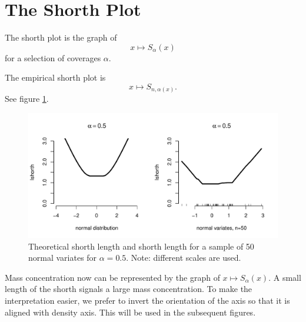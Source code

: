 \documentclass[dvips,12pt,a4paper,twoside]{amsart}
\begin{document}
\section{The Shorth Plot}
\begin{dfn}
The shorth plot is the graph of 
$$x \mapsto S_\alpha(x)$$
 for a selection of coverages $\alpha$.
\end{dfn}

The empirical shorth plot is $$x \mapsto S_{n,\alpha(x)}.$$ See figure \ref{fig:shorthdef}.
\begin{figure}[htb]
\includegraphics[width=1.0\linewidth]{TheShorthPlot-shorthdef}
\caption{Theoretical shorth length and shorth length for a sample of 50 normal variates for $\alpha=0.5$. Note: different scales are used.}
\label{fig:shorthdef}
\end{figure}


Mass concentration now can be represented by the graph of $x \mapsto S_\alpha(x)$. A
small length of the shorth signals a large mass concentration. To make the interpretation easier, we 
prefer to invert the orientation of the axis so that it is aligned with density axis. This will be used in the subsequent figures.
\end{document}
